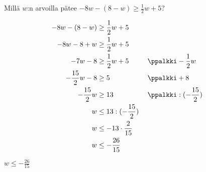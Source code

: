 \begin{esimerkki} Millä $w$:n arvoilla pätee
$-8w-(8-w) \geq \frac12 w+5$?
\begin{esimratk}
\begin{align*}
-8w-(8-w) &\geq \frac12 w+5 \\
-8w-8+w &\geq \frac12 w+5 \\
-7w-8 &\geq \frac12 w+5  \ \ \ \ \ && \ppalkki -\frac12 w \\
-\frac{15}{2} w-8 &\geq 5  \ \ \ \ \ && \ppalkki +8 \\
-\frac{15}{2} w &\geq 13  \ \ \ \ \ && \ppalkki :(-\frac{15}{2}) \\
w &\leq 13:(-\frac{15}{2}) \\
w &\leq -13\cdot \frac{2}{15} \\
w &\leq -\frac{26}{15} \\
\end{align*}
\end{esimratk}
\begin{esimvast}
$w \leq -\frac{26}{15}$
\end{esimvast}
\end{esimerkki}

